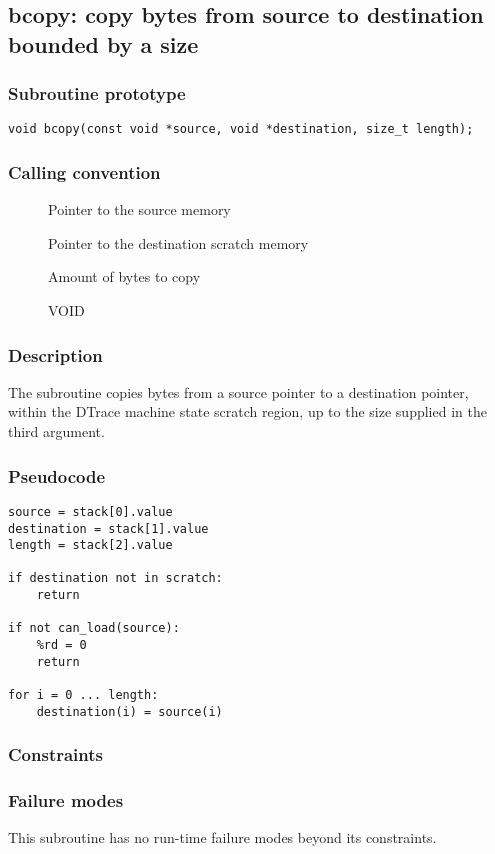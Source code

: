 \clearpage
{}
{}
\label{subr:bcopy}
\subsection*{bcopy: copy bytes from source to destination bounded by a
size}

\subsubsection*{Subroutine prototype}

\begin{verbatim}
void bcopy(const void *source, void *destination, size_t length);
\end{verbatim}

\subsubsection*{Calling convention}

\begin{description}
\item[] Pointer to the source memory
\item[] Pointer to the destination scratch memory
\item[] Amount of bytes to copy
\item[] VOID
\end{description}

\subsubsection*{Description}

The  subroutine copies bytes from a source pointer
to a destination pointer, within the DTrace machine state scratch
region, up to the size supplied in the third argument.
\subsubsection*{Pseudocode}

\begin{verbatim}
source = stack[0].value
destination = stack[1].value
length = stack[2].value

if destination not in scratch:
    return

if not can_load(source):
    %rd = 0
    return

for i = 0 ... length:
    destination(i) = source(i)
\end{verbatim}

\subsubsection*{Constraints}

\subsubsection*{Failure modes}

This subroutine has no run-time failure modes beyond its constraints.

